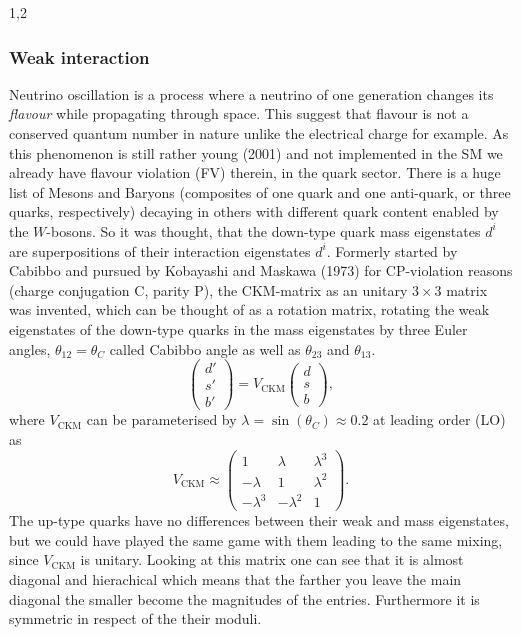 \documentclass[11pt,a4paper,twoside]{article}
\begin{document}
\begin{spacing}{1,2}
\subsubsection*{Weak interaction}
Neutrino oscillation is a process where a neutrino of one generation changes its \textit{flavour} while propagating through space. This suggest that 
flavour is not a conserved quantum number in nature unlike the electrical charge for example. As this phenomenon is still rather young (2001) and not implemented in the 
SM we already have flavour violation (FV) therein, in the quark sector. There is a huge list of Mesons and Baryons (composites of one quark and one anti-quark,
or three quarks, respectively) decaying in others with different quark content enabled by the $W$-bosons. So it was thought, that the down-type quark mass
eigenstates $d^i$ are superpositions of their interaction eigenstates $d^i$. Formerly started by Cabibbo and pursued by 
Kobayashi and Maskawa (1973) for CP-violation reasons (charge conjugation C, parity P), the CKM-matrix as an unitary $3\times 3$ matrix was invented,
which can be thought of as a rotation
matrix, rotating the weak eigenstates of the down-type quarks in the mass eigenstates by three Euler angles, $\theta_{12} = \theta_C$ called Cabibbo angle 
as well as $\theta_{23}$ and $\theta_{13}$.
\begin{equation}
 \begin{pmatrix}
  d' \\ s' \\ b'
 \end{pmatrix} = V_\text{CKM}  \begin{pmatrix}
  d \\ s \\ b
 \end{pmatrix},
\end{equation}
\noindent
where $V_\text{CKM}$ can be parameterised by $\lambda = \sin(\theta_C) \approx 0.2$ at leading order (LO) as
\begin{equation}
 V_\text{CKM} \approx \begin{pmatrix}
  1 & \lambda & \lambda^3\\
  -\lambda & 1 & \lambda^2\\
  -\lambda^3 & -\lambda^2 & 1
 \end{pmatrix}.
\end{equation}
The up-type quarks have no differences between their weak and mass eigenstates, but we could have played the same game with them leading to the 
same mixing, since $V_\text{CKM}$ is unitary. Looking at this matrix one can see that it is almost diagonal and hierachical which
means that the farther you leave the main diagonal the smaller become the magnitudes of the entries. Furthermore it is symmetric in respect of the 
their moduli.


\end{spacing}
\end{document}
